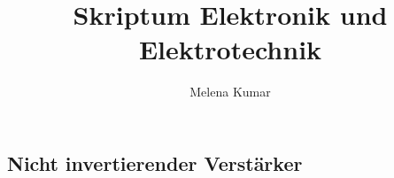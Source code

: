 \documentclass[12pt, a4paper]{book}
\title{Skriptum Elektronik und Elektrotechnik}
\author{Melena Kumar}
\begin{document}
\maketitle
\thispagestyle{empty}

\tableofcontents

\begin{refsection}
    \chapter{Nicht invertierender Verstärker}
    
\end{refsection}
\end{document}
